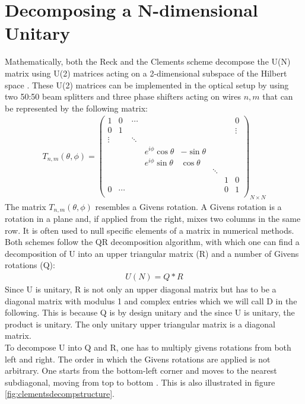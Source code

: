 \section{Decomposing a N-dimensional Unitary}
Mathematically, both the Reck and the Clements scheme decompose the U(N) matrix using U(2) matrices acting on a 2-dimensional subspace of the Hilbert space \cite{Reck1994}. These U(2) matrices can be implemented in the optical setup by using two 50:50 beam splitters and three phase shifters acting on wires $n,m$ that can be represented by the following matrix:
\begin{align}
    T_{n,m}(\theta,\phi) = \begin{pmatrix}
1 &   0     & \cdots       &        &        &        &     & 0\\
0  & 1 &        &        &        &  & & \vdots    \\
\vdots &  &  \ddots      &        &        &   &    \\
  &    & & e^{i\phi}\cos\theta & -\sin\theta & & \\
  &    & & e^{i\phi}\sin\theta & \cos\theta \\
  &        &        &        &        & \ddots \\
    &        &        &        &        & &1 &0\\
0 &   \cdots &      &        &        &  &   0   &      1\\
\end{pmatrix}_{N\times N}
\label{Tmn}
\end{align}
The matrix $T_{n,m}(\theta,\phi)$ resembles a Givens rotation. A Givens rotation is a rotation in a plane and, if applied from the right, mixes two columns in the same row. It is often used to null specific elements of a matrix in numerical methods. Both schemes follow the QR decomposition algorithm, with which one can find a decomposition of U into an upper triangular matrix (R) and a number of Givens rotations (Q):
\begin{align}
    U(N) = Q*R
\end{align}
Since U is unitary, R is not only an upper diagonal matrix but has to be a diagonal matrix with modulus 1 and complex entries which we will call D in the following. This is because Q is by design unitary and the since U is unitary, the product is unitary. The only unitary upper triangular matrix is a diagonal matrix.\\
To decompose U into Q and R, one has to multiply givens rotations from both left and right. The order in which the Givens rotations are applied is not arbitrary. One starts from the bottom-left corner and moves to the nearest subdiagonal, moving from top to bottom \cite{cilluffo2024}. This is also illustrated in figure \ref{fig:clementsdecompstructure}. 

